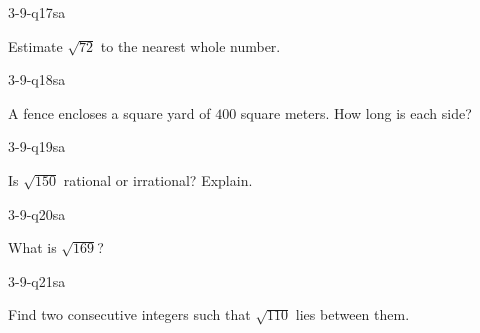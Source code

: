 \begin{practiceQuestion}{3-9-q17}{sa}
\begin{questionText}
Estimate $\sqrt{72}$ to the nearest whole number.
\end{questionText}
\end{practiceQuestion}

\begin{practiceQuestion}{3-9-q18}{sa}
\begin{questionText}
A fence encloses a square yard of $400$ square meters. How long is each side?
\end{questionText}
\end{practiceQuestion}

\begin{practiceQuestion}{3-9-q19}{sa}
\begin{questionText}
Is $\sqrt{150}$ rational or irrational? Explain.
\end{questionText}
\end{practiceQuestion}

\begin{practiceQuestion}{3-9-q20}{sa}
\begin{questionText}
What is $\sqrt{169}$?
\end{questionText}
\end{practiceQuestion}

\begin{practiceQuestion}{3-9-q21}{sa}
\begin{questionText}
Find two consecutive integers such that $\sqrt{110}$ lies between them.
\end{questionText}
\end{practiceQuestion}


